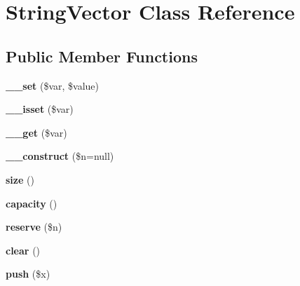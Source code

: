 \hypertarget{class_string_vector}{\section{String\-Vector Class Reference}
\label{class_string_vector}
}
\subsection*{Public Member Functions}
\begin{DoxyCompactItemize}
\item 
\hypertarget{class_string_vector_a7541bbd217859d5f1c41226fb3bf0654}{{\bfseries \-\_\-\-\_\-set} (\$var, \$value)}\label{class_string_vector_a7541bbd217859d5f1c41226fb3bf0654}

\item 
\hypertarget{class_string_vector_a14661eb73075e2c59bf1e1fab048776e}{{\bfseries \-\_\-\-\_\-isset} (\$var)}\label{class_string_vector_a14661eb73075e2c59bf1e1fab048776e}

\item 
\hypertarget{class_string_vector_abe5605d9c55504a9277900387a50ca8b}{{\bfseries \-\_\-\-\_\-get} (\$var)}\label{class_string_vector_abe5605d9c55504a9277900387a50ca8b}

\item 
\hypertarget{class_string_vector_aa4f3877c993e64d310699679c4f8d530}{{\bfseries \-\_\-\-\_\-construct} (\$n=null)}\label{class_string_vector_aa4f3877c993e64d310699679c4f8d530}

\item 
\hypertarget{class_string_vector_a3b128a843efc1772f883c383e363571c}{{\bfseries size} ()}\label{class_string_vector_a3b128a843efc1772f883c383e363571c}

\item 
\hypertarget{class_string_vector_a3b799a3e8240b77f4b8ffac1140ea18b}{{\bfseries capacity} ()}\label{class_string_vector_a3b799a3e8240b77f4b8ffac1140ea18b}

\item 
\hypertarget{class_string_vector_a9c28b2f9a09fb1ddcade015ef70ce392}{{\bfseries reserve} (\$n)}\label{class_string_vector_a9c28b2f9a09fb1ddcade015ef70ce392}

\item 
\hypertarget{class_string_vector_afff987826a3dd4659652e62345b42480}{{\bfseries clear} ()}\label{class_string_vector_afff987826a3dd4659652e62345b42480}

\item 
\hypertarget{class_string_vector_acd4bbeabe9b8ccff14f3e47e8ee4b15b}{{\bfseries push} (\$x)}\label{class_string_vector_acd4bbeabe9b8ccff14f3e47e8ee4b15b}


\end{DoxyCompactItemize}

